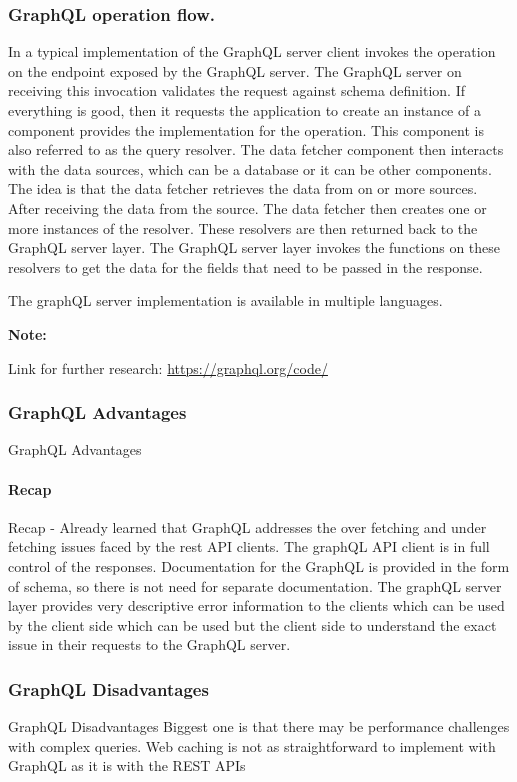 \documentclass[a4paper, 11pt]{book}
\newenvironment{note}{
    \begin{siderule}
        \textbf{Note: }
        }{
    \end{siderule}
}
\begin{document}
    \subsubsection{GraphQL operation flow.}
    In a typical implementation of the GraphQL server client invokes the operation on the endpoint exposed by the GraphQL server.
    The GraphQL server on receiving this invocation validates the request against schema definition.
    If everything is good, then it requests the application to create an instance of a component provides the implementation for the operation.
    This component is also referred to as the query resolver.
    The data fetcher component then interacts with the data sources, which can be a database or it can be other components.
    The idea is that the data fetcher retrieves the data from on or more sources.
    After receiving the data from the source.
    The data fetcher then creates one or more instances of the resolver.
    These resolvers are then returned back to the GraphQL server layer.
    The GraphQL server layer invokes the functions on these resolvers to get the data for the fields that need to be passed in the response.

    The graphQL server implementation is available in multiple languages.
    \begin{note}
        Link for further research: \href{https://graphql.org/code/}{https://graphql.org/code/}
    \end{note}

    \subsubsection{GraphQL Advantages}
    GraphQL Advantages

    \paragraph{Recap}
    Recap - Already learned that GraphQL addresses the over fetching and under fetching issues faced by the rest API clients.
    The graphQL API client is in full control of the responses.
    Documentation for the GraphQL is provided in the form of schema, so there is not need for separate documentation.
    The graphQL server layer provides very descriptive error information to the clients which can be used by the client side which can be used but the client side to understand the exact issue in their requests to the GraphQL server.

    \subsubsection{GraphQL Disadvantages}
    GraphQL Disadvantages
    Biggest one is that there may be performance challenges with complex queries.
    Web caching is not as straightforward to implement with GraphQL as it is with the REST APIs
\end{document}
